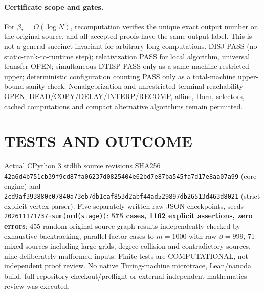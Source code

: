 \documentclass[11pt]{article}
\begin{document}
\paragraph{Certificate scope and gates.}
For $\beta_*=O(\log N)$, recomputation verifies the unique exact output number on the original source, and all accepted proofs have the same output label. This is not a general succinct invariant for arbitrary long computations. DISJ PASS (no static-rank-to-runtime step); relativization PASS for local algorithm, universal transfer OPEN; simultaneous DTISP PASS only as a same-machine restricted upper; deterministic configuration counting PASS only as a total-machine upper-bound sanity check. Nonalgebrization and unrestricted terminal reachability OPEN; DEAD/COPY/DELAY/INTERP/RECOMP, affine, Horn, selectors, cached computations and compact alternative algorithms remain permitted.
\section{TESTS AND OUTCOME}
Actual CPython 3 stdlib source revisions SHA256 \texttt{42a6d4b751cb39f9cd87fa06237d0825404e62bd7e87ba545fa7d17e8aa07a99} (core engine) and \texttt{2cd9af393880c07840a73eb7db1caf853d2abf44ad529897db26513d463d8021} (strict explicit-vertex parser). Five separately written raw JSON checkpoints, seeds \texttt{202611171737+sum(ord(stage))}: \textbf{575 cases, 1162 explicit assertions, zero errors}; 455 random original-source graph results independently checked by exhaustive backtracking, parallel factor cases to $m=1000$ with raw $\beta=999$, 71 mixed sources including large grids, degree-collision and contradictory sources, nine deliberately malformed inputs. Finite tests are COMPUTATIONAL, not independent proof review. No native Turing-machine microtrace, Lean/nanoda build, full repository checkout/preflight or external independent mathematics review was executed.
\end{document}
